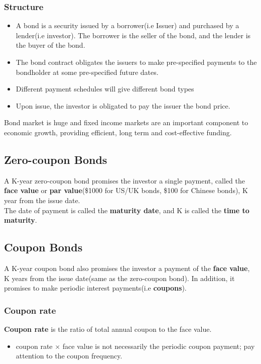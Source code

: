 \documentclass{article}
\theoremstyle{definition}
\theoremstyle{thrm}
\theoremstyle{lma}
\theoremstyle{ppst}
\theoremstyle{crlr}
\begin{document}
\subsubsection{Structure}
\begin{itemize}
	\item A bond is a security issued by a borrower(i.e Issuer) and purchased by a lender(i.e investor). The borrower is the seller of the bond, and the lender is the buyer of the bond.
	\item The bond contract obligates the issuers to make pre-specified payments to the bondholder at some pre-specified future dates.
	\item Different payment schedules will give different bond types
	\item Upon issue, the investor is obligated to pay the issuer the bond price. 
\end{itemize}
Bond market is huge and fixed income markets are an important component to economic growth, providing efficient, long term and cost-effective funding. 

\subsection{Zero-coupon Bonds}
A K-year zero-coupon bond promises the investor a single payment, called the \textbf{face value} or \textbf{par value}(\$1000 for US/UK bonds, \$100 for Chinese bonds), K year from the issue date. \\
The date of payment is called the \textbf{maturity date}, and K is called the \textbf{time to maturity}.

\subsection{Coupon Bonds}
A K-year coupon bond also promises the investor a payment of the \textbf{face value}, K years from the issue date(same as the zero-coupon bond). In addition, it promises to make periodic interest payments(i.e \textbf{coupons}).\\

\subsubsection{Coupon rate}
\textbf{Coupon rate} is the ratio of total annual coupon to the face value. \\
\begin{itemize}
	\item coupon rate $\times$ face value is not necessarily the periodic coupon payment; pay attention to the coupon frequency. 
\end{itemize}
\end{document}
